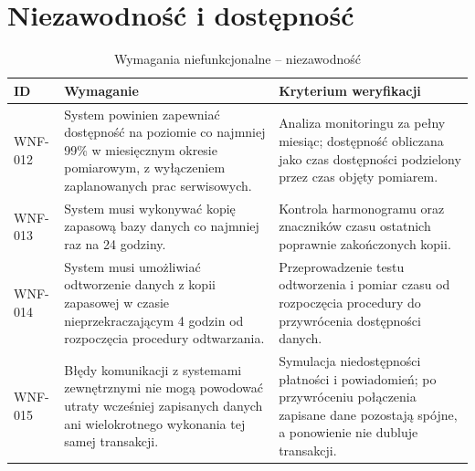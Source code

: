\documentclass[12pt,a4paper,oneside]{report}
\begin{document}
\section{Niezawodność i dostępność}
\begin{longtable}{|p{1.5cm}|p{8.4cm}|p{3.5cm}|}
\caption{Wymagania niefunkcjonalne -- niezawodność}\label{tab:wnf-niezawodnosc}\\\hline
\rowcolor{lightblue}\textbf{ID} & \textbf{Wymaganie} & \textbf{Kryterium weryfikacji}\\\hline
WNF-012 & System powinien zapewniać dostępność na poziomie co najmniej 99\% w miesięcznym okresie pomiarowym, z wyłączeniem zaplanowanych prac serwisowych. & Analiza monitoringu za pełny miesiąc; dostępność obliczana jako czas dostępności podzielony przez czas objęty pomiarem.\\\hline
WNF-013 & System musi wykonywać kopię zapasową bazy danych co najmniej raz na 24 godziny. & Kontrola harmonogramu oraz znaczników czasu ostatnich poprawnie zakończonych kopii.\\\hline
WNF-014 & System musi umożliwiać odtworzenie danych z kopii zapasowej w czasie nieprzekraczającym 4 godzin od rozpoczęcia procedury odtwarzania. & Przeprowadzenie testu odtworzenia i pomiar czasu od rozpoczęcia procedury do przywrócenia dostępności danych.\\\hline
WNF-015 & Błędy komunikacji z systemami zewnętrznymi nie mogą powodować utraty wcześniej zapisanych danych ani wielokrotnego wykonania tej samej transakcji. & Symulacja niedostępności płatności i powiadomień; po przywróceniu połączenia zapisane dane pozostają spójne, a ponowienie nie dubluje transakcji.\\\hline
\end{longtable}
\end{document}
